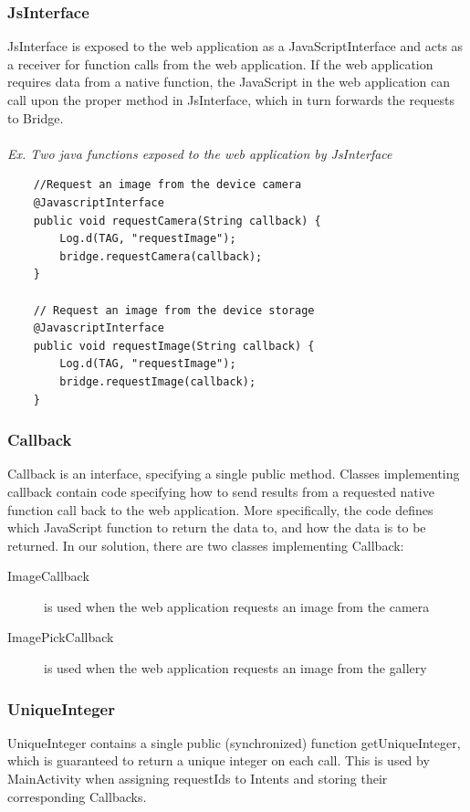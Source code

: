 \subsubsection{JsInterface}
JsInterface is exposed to the web application as a JavaScriptInterface and acts as a receiver for function calls from the web application. If the web application requires data from a native function, the JavaScript in the web application can call upon the proper method in JsInterface, which in turn forwards the requests to Bridge.
\\\\
\emph{Ex. Two java functions exposed to the web application by JsInterface}
\begin{lstlisting}
    //Request an image from the device camera
    @JavascriptInterface
    public void requestCamera(String callback) {
        Log.d(TAG, "requestImage");
        bridge.requestCamera(callback);
    }

    // Request an image from the device storage
    @JavascriptInterface
    public void requestImage(String callback) {
        Log.d(TAG, "requestImage");
        bridge.requestImage(callback);
    }
\end{lstlisting}

	
\subsubsection{Callback} 
Callback is an interface, specifying a single public method. Classes implementing callback contain code specifying how to send results from a requested native function call back to the web application. More specifically, the code defines which JavaScript function to return the data to, and how the data is to be returned. In our solution, there are two classes implementing Callback:
	\begin{description}
		\item[ImageCallback] is used when the web application requests an image from the camera
		
		\item[ImagePickCallback] is used when the web application requests an image from the gallery
	\end{description}
		
\subsubsection{UniqueInteger} 
UniqueInteger contains a single public (synchronized) function getUniqueInteger, which is guaranteed to return a unique integer on each call. This is used by MainActivity when assigning requestIds to Intents and storing their corresponding Callbacks.


